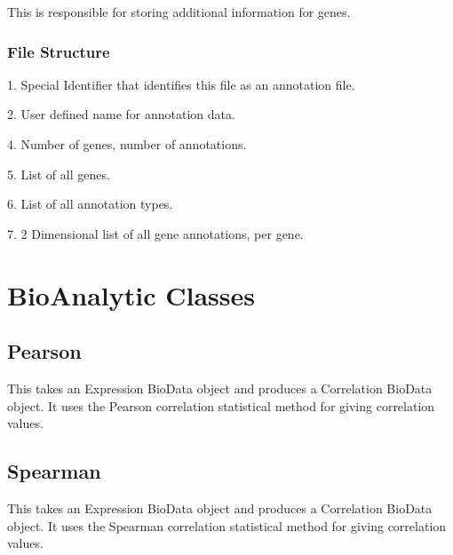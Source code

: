 \documentclass[10pt]{article}
\begin{document}
This is responsible for storing additional information for genes.

\subsubsection{File Structure}

\begin{list}{}{}
\item[1.] Special Identifier that identifies this file as an annotation file.
\item[2.] User defined name for annotation data.
\item[4.] Number of genes, number of annotations.
\item[5.] List of all genes.
\item[6.] List of all annotation types.
\item[7.] 2 Dimensional list of all gene annotations, per gene.
\end{list}

\newpage
\section{BioAnalytic Classes}

\subsection{Pearson}

This takes an Expression BioData object and produces a Correlation BioData 
object. It uses the Pearson correlation statistical method for giving 
correlation values.

\subsection{Spearman}

This takes an Expression BioData object and produces a Correlation BioData 
object. It uses the Spearman correlation statistical method for giving 
correlation values.
\end{document}
